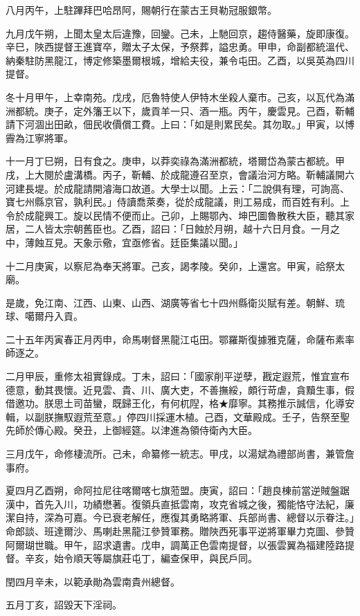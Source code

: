 \begin{pinyinscope}
八月丙午，上駐蹕拜巴哈昂阿，賜朝行在蒙古王貝勒冠服銀幣。

九月戊午朔，上聞太皇太后違豫，回鑾。己未，上馳回京，趨侍醫藥，旋即康復。辛巳，陜西提督王進寶卒，贈太子太保，予祭葬，謚忠勇。甲申，命副都統溫代、納秦駐防黑龍江，博定修築墨爾根城，增給夫役，兼令屯田。乙酉，以吳英為四川提督。

冬十月甲午，上幸南苑。戊戌，厄魯特使人伊特木坐殺人棄市。己亥，以瓦代為滿洲都統。庚子，定外籓王以下，歲貢羊一只、酒一瓶。丙午，慶雲見。己酉，靳輔請下河涸出田畝，佃民收價償工費。上曰：「如是則累民矣。其勿取。」甲寅，以博霽為江寧將軍。

十一月丁巳朔，日有食之。庚申，以莽奕祿為滿洲都統，塔爾岱為蒙古都統。甲戌，上大閱於盧溝橋。丙子，靳輔、於成龍遵召至京，會議治河方略。靳輔議開六河建長堤。於成龍請開濬海口故道。大學士以聞。上云：「二說俱有理，可詢高、寶七州縣京官，孰利民。」侍讀喬萊奏，從於成龍議，則工易成，而百姓有利。上令於成龍興工。旋以民情不便而止。己卯，上賜鄂內、坤巴圖魯散秩大臣，聽其家居，二人皆太宗朝舊臣也。乙酉，詔曰：「日蝕於月朔，越十六日月食。一月之中，薄蝕互見。天象示儆，宜亟修省。廷臣集議以聞。」

十二月庚寅，以察尼為奉天將軍。己亥，謁孝陵。癸卯，上還宮。甲寅，祫祭太廟。

是歲，免江南、江西、山東、山西、湖廣等省七十四州縣衛災賦有差。朝鮮、琉球、噶爾丹入貢。

二十五年丙寅春正月丙申，命馬喇督黑龍江屯田。鄂羅斯復據雅克薩，命薩布素率師逐之。

二月甲辰，重修太祖實錄成。丁未，詔曰：「國家削平逆孽，戡定遐荒，惟宜宣布德意，動其畏懷。近見雲、貴、川、廣大吏，不善撫綏，頗行苛虐，貪黷生事，假借邀功。朕思土司苗蠻，既歸王化，有何杌隉，格★靡寧。其務推示誠信，化導安輯，以副朕撫馭遐荒至意。」停四川採運木植。己酉，文華殿成。壬子，告祭至聖先師於傳心殿。癸丑，上御經筵。以津進為領侍衛內大臣。

三月戊午，命修棲流所。己未，命纂修一統志。甲戌，以湯斌為禮部尚書，兼管詹事府。

夏四月乙酉朔，命阿拉尼往喀爾喀七旗蒞盟。庚寅，詔曰：「趙良棟前當逆賊盤踞漢中，首先入川，功績懋著。復領兵直抵雲南，攻克省城之後，獨能恪守法紀，廉潔自持，深為可嘉。今已衰老解任，應復其勇略將軍、兵部尚書、總督以示眷注。」命郎談、班達爾沙、馬喇赴黑龍江參贊軍務。贈陜西死事平逆將軍畢力克圖、參贊阿爾瑚世職。甲午，詔求遺書。戊申，調萬正色雲南提督，以張雲翼為福建陸路提督。辛亥，始令順天等屬旗莊屯丁，編查保甲，與民戶同。

閏四月辛未，以範承勛為雲南貴州總督。

五月丁亥，詔毀天下淫祠。


\end{pinyinscope}
